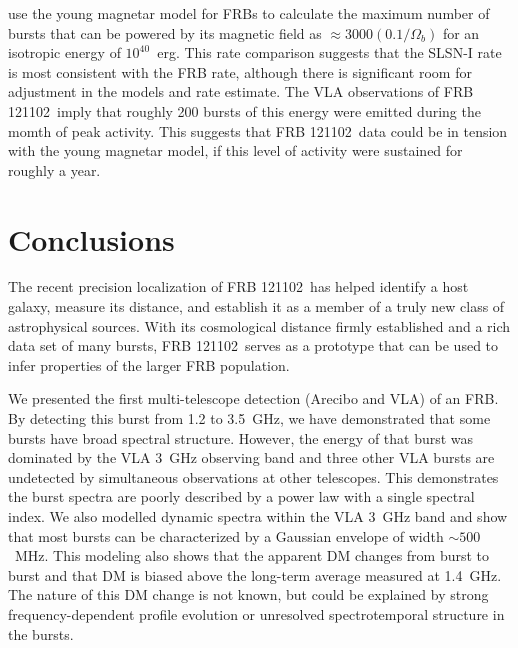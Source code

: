 \documentclass[twocolumn]{aastex61}
\newcommand{\frb}{FRB 121102}
\begin{document}
\citet{2017arXiv170102370M} use the young magnetar model for FRBs to calculate the maximum number of bursts that can be powered by its magnetic field as $\approx3000 (0.1/\Omega_b)$ for an isotropic energy of $10^{40}$~erg. This rate comparison suggests that the SLSN-I rate is most consistent with the FRB rate, although there is significant room for adjustment in the models and rate estimate. The VLA observations of \frb\ imply that roughly 200 bursts of this energy were emitted during the momth of peak activity. This suggests that \frb\ data could be in tension with the young magnetar model, if this level of activity were sustained for roughly a year.


\section{Conclusions}

The recent precision localization of \frb\ has helped identify a host galaxy, measure its distance, and establish it as a member of a truly new class of astrophysical sources. With its cosmological distance firmly established and a rich data set of many bursts, \frb\ serves as a prototype that can be used to infer properties of the larger FRB population.

We presented the first multi-telescope detection (Arecibo and VLA) of an FRB. By detecting this burst from 1.2 to 3.5~GHz, we have demonstrated that some bursts have broad spectral structure. However, the energy of that burst was dominated by the VLA 3~GHz observing band and three other VLA bursts are undetected by simultaneous observations at other telescopes. This demonstrates the burst spectra are poorly described by a power law with a single spectral index. We also modelled dynamic spectra within the VLA 3~GHz band and show that most bursts can be characterized by a Gaussian envelope of width $\sim500$\ MHz. This modeling also shows that the apparent DM changes from burst to burst and that DM is biased above the long-term average measured at 1.4~GHz. The nature of this DM change is not known, but could be explained by strong frequency-dependent profile evolution or unresolved spectrotemporal structure in the bursts.
\end{document}
